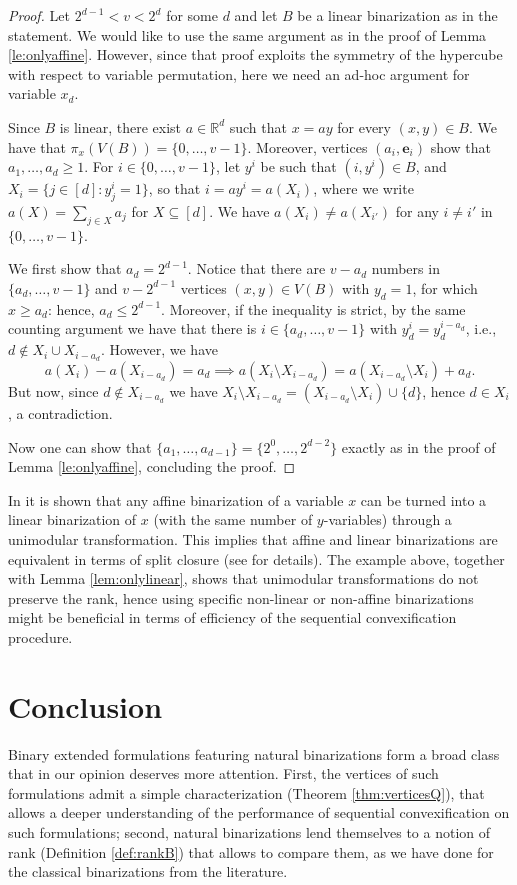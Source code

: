 \documentclass[11pt,a4paper]{article}
\newcommand{\R}{\mathbb{R}}
\newcommand{\1}{\textbf{1}}
\begin{document}
\begin{proof}
Let $2^{d-1}< v< 2^d$ for some $d$ and let $B$ be a linear binarization as in the statement. 
We would like to use the same argument as in the proof of Lemma \ref{le:onlyaffine}. However, since that proof exploits the symmetry of the hypercube with respect to variable permutation, here we need an ad-hoc argument for variable $x_d$.

Since $B$ is linear, there exist $a\in\R^d$ such that $x=ay$ for every $(x,y)\in B$.
We have that $\pi_x(V(B))=\{0,\dots,v-1\}$. Moreover, vertices $(a_i,\mathbf{e}_i)$ show that $a_1,\dots,a_d\ge1$. For $i\in \{0,\dots,v-1\}$, let $y^i$ be such that $(i,y^i)\in B$, and $X_i=\{j\in [d]: y^i_j=1\}$, so that $i=ay^i=a(X_i)$, where we write $a(X)=\sum_{j\in X} a_j$ for $X\subseteq [d]$. We have $a(X_i)\neq a(X_{i'})$ for any $i\neq i'$ in  $\{0,\dots,v-1\}$. 

We first show that $a_d=2^{d-1}$. Notice that there are $v-a_d$ numbers in $\{a_d,\dots, v-1\}$ and $v-2^{d-1}$ vertices $(x,y)\in V(B)$ with $y_d=1$, for which $x\geq a_d$: hence, $a_d\leq 2^{d-1}$. Moreover, if the inequality is strict, by the same counting argument we have that there is $i\in\{a_d,\dots,v-1\}$ with $y^i_{d}=y^{i-a_d}_d$, i.e., $d\not\in X_i\cup X_{i-a_d}$.
However, we have \[a(X_{i})-a(X_{i-a_d})=a_d \implies a(X_{i}\setminus X_{i-a_d})=a(X_{i-a_d}\setminus X_i)+a_d.\]
But now, since $d\not\in X_{i-a_d}$ we have $X_i\setminus X_{i-a_d}=(X_{i-a_d}\setminus X_i)\cup \{d\}$, hence $d\in X_{i}$, a contradiction.

Now one can show that $\{a_1,\dots,a_{d-1}\}=\{2^0,\dots,2^{d-2}\}$ exactly as in the proof of Lemma \ref{le:onlyaffine}, concluding the proof.
\end{proof}

In \cite{dash2018binary} it is shown that any affine binarization of a variable $x$ can be turned into a linear binarization of $x$ (with the same number of $y$-variables) through a unimodular transformation. This implies that affine and linear binarizations are equivalent in terms of split closure (see \cite{dash2018binary} for details). The example above, together with Lemma \ref{lem:onlylinear}, shows that unimodular transformations do not preserve the rank, hence using specific non-linear or non-affine binarizations might be beneficial in terms of efficiency of the sequential convexification procedure.

\section{Conclusion}\label{sec:conclusion}
Binary extended formulations featuring natural binarizations form a broad class that in our opinion deserves more attention. First, the vertices of such formulations admit a simple characterization (Theorem \ref{thm:verticesQ}), that allows a deeper understanding of the performance of sequential convexification on such formulations; second, natural binarizations lend themselves to a notion of rank (Definition \ref{def:rankB}) that allows to compare them, as we have done for the classical binarizations from the literature.
\end{document}
